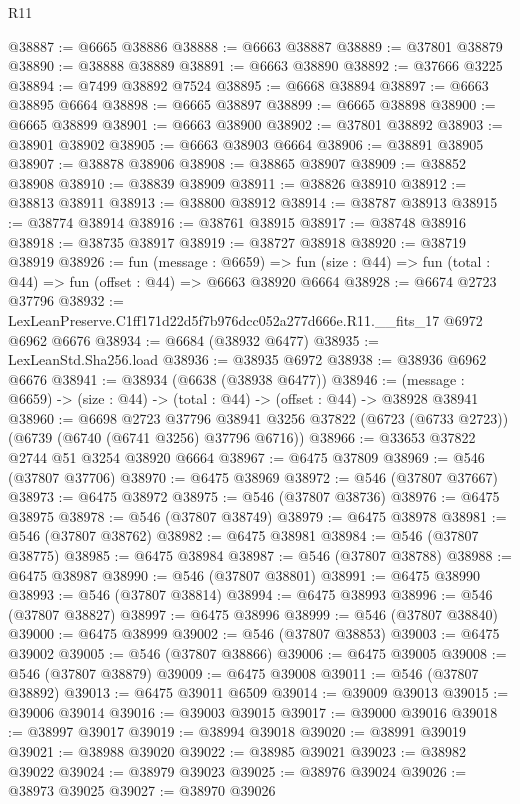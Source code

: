 \begin{lexlean}{R11}
\begin{coremodule}
@38887 := @6665 @38886
@38888 := @6663 @38887
@38889 := @37801 @38879
@38890 := @38888 @38889
@38891 := @6663 @38890
@38892 := @37666 @3225
@38894 := @7499 @38892 @7524
@38895 := @6668 @38894
@38897 := @6663 @38895 @6664
@38898 := @6665 @38897
@38899 := @6665 @38898
@38900 := @6665 @38899
@38901 := @6663 @38900
@38902 := @37801 @38892
@38903 := @38901 @38902
@38905 := @6663 @38903 @6664
@38906 := @38891 @38905
@38907 := @38878 @38906
@38908 := @38865 @38907
@38909 := @38852 @38908
@38910 := @38839 @38909
@38911 := @38826 @38910
@38912 := @38813 @38911
@38913 := @38800 @38912
@38914 := @38787 @38913
@38915 := @38774 @38914
@38916 := @38761 @38915
@38917 := @38748 @38916
@38918 := @38735 @38917
@38919 := @38727 @38918
@38920 := @38719 @38919
@38926 := fun (message : @6659) =>
  fun (size : @44) => fun (total : @44) => fun (offset : @44) => @6663 @38920 @6664
@38928 := @6674 @2723 @37796
@38932 := LexLeanPreserve.C1ff171d22d5f7b976dcc052a277d666e.R11.__fits_17 @6972 @6962 @6676
@38934 := @6684 (@38932 @6477)
@38935 := LexLeanStd.Sha256.load
@38936 := @38935 @6972
@38938 := @38936 @6962 @6676
@38941 := @38934 (@6638 (@38938 @6477))
@38946 := (message : @6659) -> (size : @44) -> (total : @44) -> (offset : @44) -> @38928 @38941
@38960 := @6698
    @2723
    @37796
    @38941
    @3256
    @37822
    (@6723 (@6733 @2723))
    (@6739 (@6740 (@6741 @3256) @37796 @6716))
@38966 := @33653 @37822 @2744 @51 @3254 @38920 @6664
@38967 := @6475 @37809
@38969 := @546 (@37807 @37706)
@38970 := @6475 @38969
@38972 := @546 (@37807 @37667)
@38973 := @6475 @38972
@38975 := @546 (@37807 @38736)
@38976 := @6475 @38975
@38978 := @546 (@37807 @38749)
@38979 := @6475 @38978
@38981 := @546 (@37807 @38762)
@38982 := @6475 @38981
@38984 := @546 (@37807 @38775)
@38985 := @6475 @38984
@38987 := @546 (@37807 @38788)
@38988 := @6475 @38987
@38990 := @546 (@37807 @38801)
@38991 := @6475 @38990
@38993 := @546 (@37807 @38814)
@38994 := @6475 @38993
@38996 := @546 (@37807 @38827)
@38997 := @6475 @38996
@38999 := @546 (@37807 @38840)
@39000 := @6475 @38999
@39002 := @546 (@37807 @38853)
@39003 := @6475 @39002
@39005 := @546 (@37807 @38866)
@39006 := @6475 @39005
@39008 := @546 (@37807 @38879)
@39009 := @6475 @39008
@39011 := @546 (@37807 @38892)
@39013 := @6475 @39011 @6509
@39014 := @39009 @39013
@39015 := @39006 @39014
@39016 := @39003 @39015
@39017 := @39000 @39016
@39018 := @38997 @39017
@39019 := @38994 @39018
@39020 := @38991 @39019
@39021 := @38988 @39020
@39022 := @38985 @39021
@39023 := @38982 @39022
@39024 := @38979 @39023
@39025 := @38976 @39024
@39026 := @38973 @39025
@39027 := @38970 @39026

\end{coremodule}
\end{lexlean}
